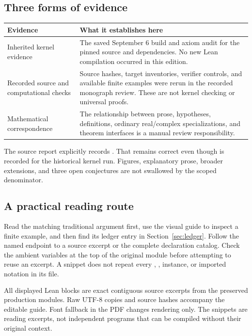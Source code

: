 \subsection{Three forms of evidence}
\begin{longtable}{@{}p{.23\linewidth}p{.70\linewidth}@{}}
\toprule Evidence & What it establishes here\\\midrule\endhead
Inherited kernel evidence & The saved September 6 build and axiom audit for the pinned source and dependencies. No new Lean compilation occurred in this edition.\\
Recorded source and computational checks & Source hashes, target inventories, verifier controls, and available finite examples were rerun in the recorded monograph review. These are not kernel checking or universal proofs.\\
Mathematical correspondence & The relationship between prose, hypotheses, definitions, ordinary real/complex specializations, and theorem interfaces is a manual review responsibility.\\
\bottomrule\end{longtable}

The source report explicitly records . That remains correct even though  is recorded for the historical kernel run. Figures, explanatory prose, broader extensions, and three open conjectures are not swallowed by the scoped denominator.

\subsection{A practical reading route}
Read the matching traditional argument first, use the visual guide to inspect a finite example, and then find its ledger entry in Section~\ref{sec:ledger}. Follow the named endpoint to a source excerpt or the complete declaration catalog. Check the ambient variables at the top of the original module before attempting to reuse an excerpt. A snippet does not repeat every , , instance, or imported notation in its file.

All displayed Lean blocks are exact contiguous source excerpts from the preserved production modules. Raw UTF-8 copies and source hashes accompany the editable guide. Font fallback in the PDF changes rendering only. The snippets are reading excerpts, not independent programs that can be compiled without their original context.

